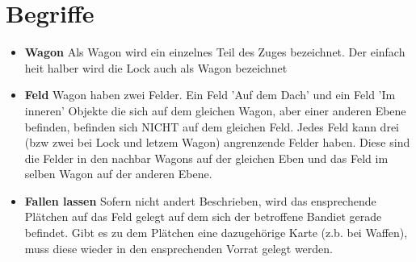 \section{Begriffe}

\begin{itemize}
    \item \textbf{Wagon} Als Wagon wird ein einzelnes Teil des Zuges bezeichnet. Der einfach heit halber wird die Lock auch als
            Wagon bezeichnet
    \item \textbf{Feld} Wagon haben zwei Felder. Ein Feld 'Auf dem Dach' und ein Feld 'Im inneren'
            Objekte die sich auf dem gleichen Wagon, aber einer anderen Ebene befinden, befinden sich NICHT
            auf dem gleichen Feld. Jedes Feld kann drei (bzw zwei bei Lock und letzem Wagon) angrenzende Felder haben.
            Diese sind die Felder in den nachbar Wagons auf der gleichen Eben und das Feld im selben Wagon auf der
            anderen Ebene.
    \item \textbf{Fallen lassen} Sofern nicht andert Beschrieben, wird das ensprechende Plätchen auf das Feld gelegt auf dem
            sich der betroffene Bandiet gerade befindet. Gibt es zu dem Plätchen eine dazugehörige Karte
            (z.b. bei Waffen), muss diese wieder in den ensprechenden Vorrat gelegt werden.
\end{itemize}